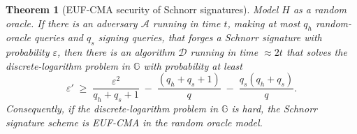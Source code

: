 \documentclass[11pt,a4paper]{article}
\newtheorem{theorem}{Theorem}[section]
\theoremstyle{definition}
\theoremstyle{remark}
\newcommand{\G}{\ensuremath{\mathbb{G}}}
\begin{document}
\begin{theorem}[EUF-CMA security of Schnorr signatures]\label{signatures:thm:schnorr-euf}
Model \(H\) as a random oracle. If there is an adversary \(\mathcal{A}\) running in time \(t\), making at most \(q_h\) random-oracle queries and \(q_s\) signing queries, that forges a Schnorr signature with probability \(\varepsilon\), then there is an algorithm \(\mathcal{D}\) running in time \(\approx 2t\) that solves the discrete-logarithm problem in \(\G\) with probability at least
\[
  \varepsilon' \;\ge\; \frac{\varepsilon^2}{q_h + q_s + 1} \;-\; \frac{(q_h+q_s+1)}{q} \;-\; \frac{q_s(q_h+q_s)}{q}.
\]
Consequently, if the discrete-logarithm problem in \(\G\) is hard, the Schnorr signature scheme is EUF-CMA in the random oracle model.
\end{theorem}
\end{document}

